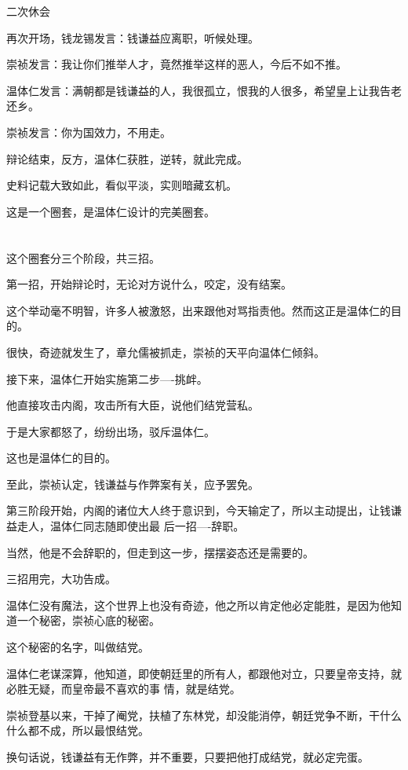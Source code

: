 \documentclass[11pt,a4paper,onecolumn]{article}
\begin{document}
二次休会

再次开场，钱龙锡发言：钱谦益应离职，听候处理。

崇祯发言：我让你们推举人才，竟然推举这样的恶人，今后不如不推。

温体仁发言：满朝都是钱谦益的人，我很孤立，恨我的人很多，希望皇上让我告老还乡。

崇祯发言：你为国效力，不用走。

辩论结束，反方，温体仁获胜，逆转，就此完成。

史料记载大致如此，看似平淡，实则暗藏玄机。

这是一个圈套，是温体仁设计的完美圈套。

\section[\thesection]{}

这个圈套分三个阶段，共三招。

第一招，开始辩论时，无论对方说什么，咬定，没有结案。

这个举动毫不明智，许多人被激怒，出来跟他对骂指责他。然而这正是温体仁的目的。

很快，奇迹就发生了，章允儒被抓走，崇祯的天平向温体仁倾斜。

接下来，温体仁开始实施第二步----挑衅。

他直接攻击内阁，攻击所有大臣，说他们结党营私。

于是大家都怒了，纷纷出场，驳斥温体仁。

这也是温体仁的目的。

至此，崇祯认定，钱谦益与作弊案有关，应予罢免。

第三阶段开始，内阁的诸位大人终于意识到，今天输定了，所以主动提出，让钱谦益走人，温体仁同志随即使出最
后一招----辞职。

当然，他是不会辞职的，但走到这一步，摆摆姿态还是需要的。

三招用完，大功告成。

温体仁没有魔法，这个世界上也没有奇迹，他之所以肯定他必定能胜，是因为他知道一个秘密，崇祯心底的秘密。

这个秘密的名字，叫做结党。

温体仁老谋深算，他知道，即使朝廷里的所有人，都跟他对立，只要皇帝支持，就必胜无疑，而皇帝最不喜欢的事
情，就是结党。

崇祯登基以来，干掉了阉党，扶植了东林党，却没能消停，朝廷党争不断，干什么什么都不成，所以最恨结党。

换句话说，钱谦益有无作弊，并不重要，只要把他打成结党，就必定完蛋。
\end{document}
